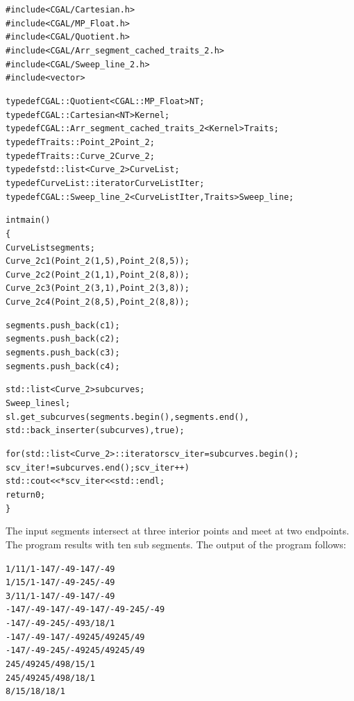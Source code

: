 \begin{alltt}
#include <CGAL/Cartesian.h>
#include <CGAL/MP_Float.h>
#include <CGAL/Quotient.h>
#include <CGAL/Arr_segment_cached_traits_2.h>
#include <CGAL/Sweep_line_2.h>
#include <vector>

typedef CGAL::Quotient<CGAL::MP_Float>                  NT;
typedef CGAL::Cartesian<NT>                             Kernel;
typedef CGAL::Arr_segment_cached_traits_2<Kernel>       Traits;
typedef Traits::Point_2                                 Point_2;
typedef Traits::Curve_2                                 Curve_2;
typedef std::list<Curve_2>                              CurveList;
typedef CurveList::iterator                             CurveListIter;
typedef CGAL::Sweep_line_2<CurveListIter, Traits>       Sweep_line;

int main()
\{
  CurveList  segments;
  Curve_2 c1(Point_2(1,5), Point_2(8,5));
  Curve_2 c2(Point_2(1,1), Point_2(8,8));
  Curve_2 c3(Point_2(3,1), Point_2(3,8));
  Curve_2 c4(Point_2(8,5), Point_2(8,8));

  segments.push_back(c1);
  segments.push_back(c2);
  segments.push_back(c3);
  segments.push_back(c4);

  std::list<Curve_2> subcurves;
  Sweep_line sl;
  sl.get_subcurves(segments.begin(), segments.end(), 
		   std::back_inserter(subcurves), true);
  
  for (std::list<Curve_2>::iterator scv_iter = subcurves.begin(); 
       scv_iter != subcurves.end(); scv_iter++)
    std::cout << *scv_iter << std::endl;
  return 0;
\}
\end{alltt}

The input segments intersect at three interior points and meet at two
endpoints. The program results with ten sub segments.
The output of the program follows:

\begin{alltt}
1/1 1/1 -147/-49 -147/-49
1/1 5/1 -147/-49 -245/-49
3/1 1/1 -147/-49 -147/-49
-147/-49 -147/-49 -147/-49 -245/-49
-147/-49 -245/-49 3/1 8/1
-147/-49 -147/-49 245/49 245/49
-147/-49 -245/-49 245/49 245/49
245/49 245/49 8/1 5/1
245/49 245/49 8/1 8/1
8/1 5/1 8/1 8/1
\end{alltt}
